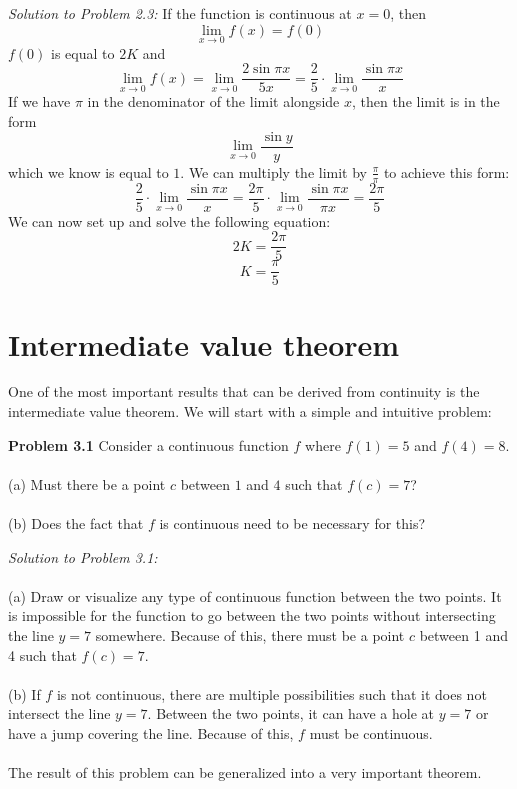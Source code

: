 \documentclass[11pt]{scrartcl}
\begin{document}
\noindent
\textit{Solution to Problem 2.3:} If the function is continuous at $x=0$, then 
$$\lim_{x \to 0} f(x)=f(0)$$
$f(0)$ is equal to $2K$ and 
$$\lim_{x \to 0} f(x)=\lim_{x \to 0} \frac{2\sin \pi x}{5x}=\frac{2}{5}\cdot\lim_{x \to 0} \frac{\sin \pi x}{x}$$
If we have $\pi$ in the denominator of the limit alongside $x$, then the limit is in the form 
$$\lim_{x \to 0} \frac{\sin y}{y}$$
which we know is equal to $1$. We can multiply the limit by $\frac{\pi}{\pi}$ to achieve this form: 
$$\frac{2}{5}\cdot\lim_{x \to 0} \frac{\sin \pi x}{x}=\frac{2 \pi}{5}\cdot \lim_{x \to 0} \frac{\sin \pi x}{\pi x}=\frac{2 \pi}{5}$$
We can now set up and solve the following equation: 
$$2K=\frac{2 \pi}{5}$$
$$K=\frac{\pi}{5}$$
\section{Intermediate value theorem}
One of the most important results that can be derived from continuity is the intermediate value theorem. We will start with a simple and intuitive problem: \\
\begin{tcolorbox}
[colback=purple!5!white,colframe=purple!75!black]
\textbf{Problem 3.1} Consider a continuous function $f$ where $f(1)=5$ and $f(4)=8$.\\
\noindent\\
(a) Must there be a point $c$ between $1$ and $4$ such that $f(c)=7$?\\
\noindent\\
(b) Does the fact that $f$ is continuous need to be necessary for this?
\end{tcolorbox}
\noindent
\textit{Solution to Problem 3.1:}\\
\noindent\\
(a) Draw or visualize any type of continuous function between the two points. It is impossible for the function to go between the two points without intersecting the line $y=7$ somewhere. Because of this, there must be a point $c$ between 1 and 4 such that $f(c)=7$.  \\
\noindent\\
(b) If $f$ is not continuous, there are multiple possibilities such that it does not intersect the line $y=7$. Between the two points, it can have a hole at $y=7$ or have a jump covering the line. Because of this, $f$ must be continuous. \\
\noindent\\
The result of this problem can be generalized into a very important theorem.\\
\end{document}
